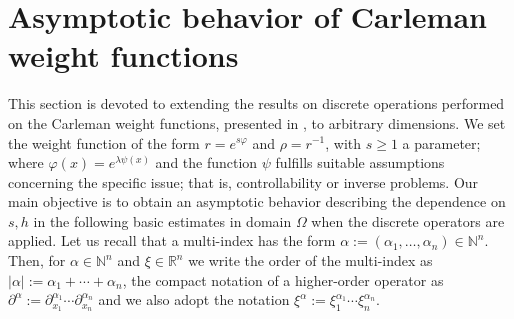 \documentclass[11pt,oneside,leqno]{amsart}
\numberwithin{equation}{section}
\numberwithin{equation}{section}
\begin{document}
\section{Asymptotic behavior of Carleman weight functions}\label{sec:asymp:weight}
This section is devoted to extending the results on discrete operations performed on the Carleman weight functions, presented in \cite{LOP-2020}, to arbitrary dimensions. We set the weight function of the form $r = e^{s\varphi}$ and $\rho = r^{-1}$, with $s\geq 1$ a parameter; where    $\varphi(x)=e^{\lambda\psi(x)}$ and the function $\psi$ fulfills suitable assumptions concerning the specific issue; that is, controllability or inverse problems. Our main objective is to obtain an asymptotic behavior describing the dependence on $s, h$ in the following basic estimates in domain $\Omega$ when the discrete operators are applied. 
Let us recall that a multi-index has the form $\alpha:=(\alpha_{1},\ldots,\alpha_{n})\in\mathbb{N}^{n}$. Then, for $\alpha\in\mathbb{N}^{n}$ and $\xi\in\mathbb{R}^{n}$ we write the order of the multi-index as $|\alpha|:=\alpha_{1}+\cdots+\alpha_{n}$, the compact notation of a higher-order operator as $
\partial^{\alpha}:=\partial_{x_{1}}^{\alpha_{1}}\cdots\partial_{x_{n}}^{\alpha_{n}}$ and we also adopt the notation
$\xi^{\alpha}:=\xi_{1}^{\alpha_{1}}\cdots\xi_{n}^{\alpha_{n}}$.
\end{document}
